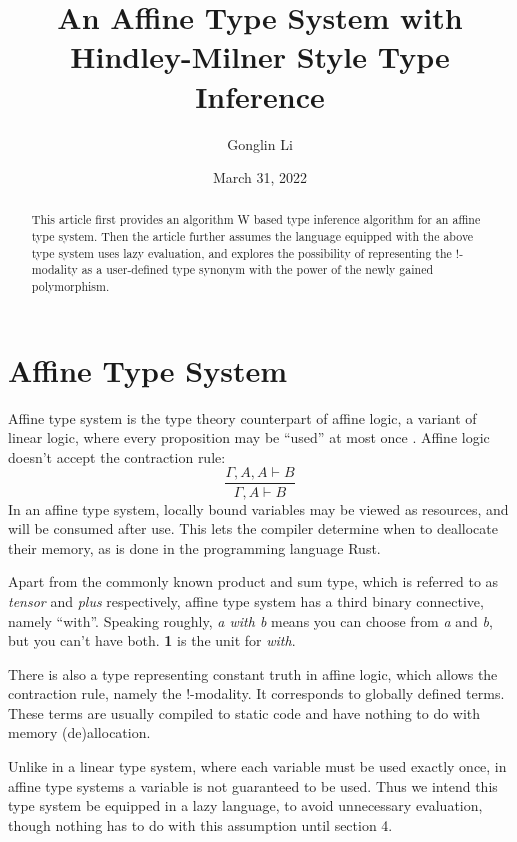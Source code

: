 \documentclass{article}
\title{An Affine Type System with Hindley-Milner Style Type Inference}
\author{Gonglin Li}
\date{March 31, 2022}
\begin{document}
\maketitle

\begin{abstract}
This article first provides an algorithm W based type inference algorithm for an affine type system. Then the article further assumes the language equipped with the above type system uses lazy evaluation, and explores the possibility of representing the !-modality as a user-defined type synonym with the power of the newly gained polymorphism.
\end{abstract}

\section{Affine Type System}

Affine type system is the type theory counterpart of affine logic, a variant of linear logic, where every proposition may be ``used'' at most once \cite{hoffmann19}. Affine logic doesn't accept the contraction rule:
\begin{displaymath}
  \frac{\Gamma, A, A\vdash B}{\Gamma, A \vdash B}
\end{displaymath}
In an affine type system, locally bound variables may be viewed as resources, and will be consumed after use. This lets the compiler determine when to deallocate their memory, as is done in the programming language Rust.

Apart from the commonly known product and sum type, which is referred to as \textit{tensor} and \textit{plus} respectively, affine type system has a third binary connective, namely ``with''. Speaking roughly, \textit{a with b} means you can choose from \textit{a} and \textit{b}, but you can't have both. \textbf{1} is the unit for \textit{with}.

There is also a type representing constant truth in affine logic, which allows the contraction rule, namely the !-modality. It corresponds to globally defined terms. These terms are usually compiled to static code and have nothing to do with memory (de)allocation.

Unlike in a linear type system, where each variable must be used exactly once, in affine type systems a variable is not guaranteed to be used. Thus we intend this type system be equipped in a lazy language, to avoid unnecessary evaluation, though nothing has to do with this assumption until section 4.
\end{document}
